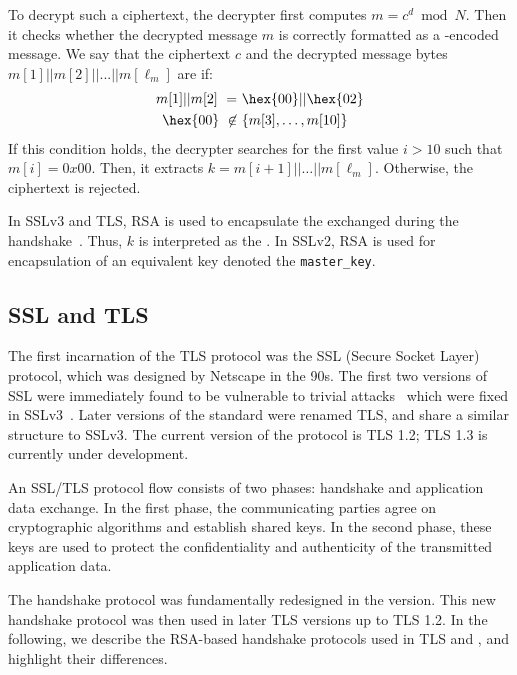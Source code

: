 To decrypt such a ciphertext, the decrypter first computes $m = c^d
\bmod N$.  Then it checks whether the decrypted message $m$ is
correctly formatted as a \PKCS-encoded message. We say that the
ciphertext $c$ and the decrypted message bytes $m{[1]} || m{[2]} || ... ||
m{[\ell_m]}$ are \PKCSconform if:
\begin{equation*} 
	\begin{split} 
		m{[1]}||m{[2]} \text{ } = &\text{ } \hex{00} || \hex{02}\\
		\hex{00} \text{ } \not \in &\text{ } \{m{[3]}, \ldots,m{[10]}\}\\ 
	\end{split}
\end{equation*} 
If this condition holds, the decrypter searches for the first value
$i>10$ such that $m{[i]}=0x00$. Then, it extracts $k =
m{[i+1]}||\ldots||m{[\ell_m]}$. Otherwise, the ciphertext is rejected.

In SSLv3 and TLS, RSA \PKCS is used to encapsulate the
\pms exchanged during the
handshake~\cite{rfc5246}. Thus, $k$ is interpreted as the
\pms.  In SSLv2, RSA \PKCS is used for
encapsulation of an equivalent key denoted the \texttt{master\_key}.


\subsection{SSL and TLS}
The first incarnation of the TLS protocol was the SSL (Secure Socket
Layer) protocol, which was designed by Netscape in the 90s. The first two
versions of SSL were immediately found to be vulnerable to trivial
attacks~\cite{ProhibitingSSLv2,WagnerSchneier:SSLAnalysis:96} which 
were fixed in SSLv3~\cite{SSLv3}.  Later versions of
the standard were renamed TLS, and share a similar structure to SSLv3.
The current version of the protocol is TLS 1.2; TLS 1.3 is currently
under development.

An SSL/TLS protocol flow consists of two phases: handshake and
application data exchange. In the first phase, the communicating
parties agree on cryptographic algorithms and establish shared
keys. In the second phase, these keys are used to protect the
confidentiality and authenticity of the transmitted application data.

The handshake protocol was fundamentally redesigned in the \sslthree
version. This new handshake protocol was then used in later TLS
versions up to TLS 1.2. In the following, we describe the RSA-based
handshake protocols used in TLS and \ssltwo, and highlight their
differences.

